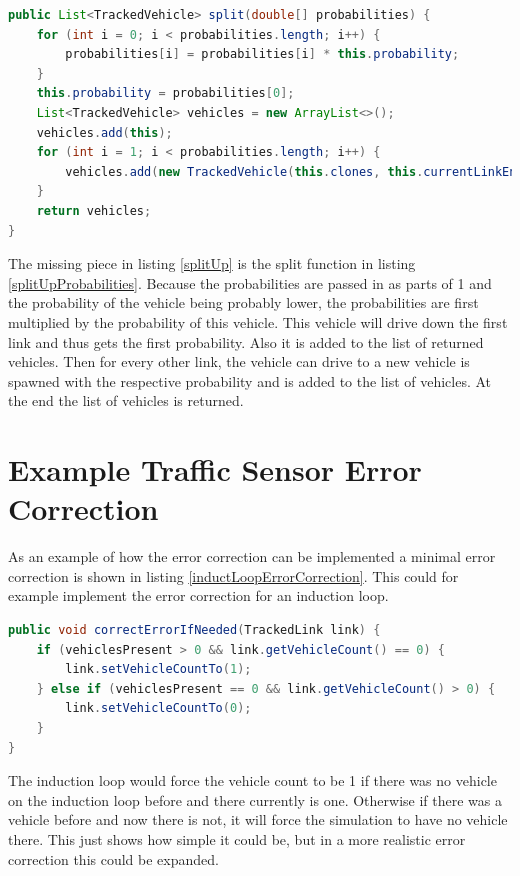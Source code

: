 \vspace{0.5em}

\begin{lstlisting}[caption={Split Up Vehicle Probabilities}, label=splitUpProbabilities, language=Java]
public List<TrackedVehicle> split(double[] probabilities) {
	for (int i = 0; i < probabilities.length; i++) {
		probabilities[i] = probabilities[i] * this.probability;
	}
	this.probability = probabilities[0];
	List<TrackedVehicle> vehicles = new ArrayList<>();
	vehicles.add(this);
	for (int i = 1; i < probabilities.length; i++) {
		vehicles.add(new TrackedVehicle(this.clones, this.currentLinkEnteredTime, probabilities[i]));
	}
	return vehicles;
}
\end{lstlisting}

The missing piece in listing \ref{splitUp} is the split function in listing \ref{splitUpProbabilities}. Because the probabilities are passed in as parts of 1 and the probability of the vehicle being probably lower, the probabilities are first multiplied by the probability of this vehicle. This vehicle will drive down the first link and thus gets the first probability. Also it is added to the list of returned vehicles. Then for every other link, the vehicle can drive to a new vehicle is spawned with the respective probability and is added to the list of vehicles. At the end the list of vehicles is returned.

\section{Example Traffic Sensor Error Correction}

As an example of how the error correction can be implemented a minimal error correction is shown in listing \ref{inductLoopErrorCorrection}. This could for example implement the error correction for an induction loop.

\vspace{0.5em}

\begin{lstlisting}[caption={Induction Loop Error Correction}, label=inductLoopErrorCorrection, language=Java]
public void correctErrorIfNeeded(TrackedLink link) {
	if (vehiclesPresent > 0 && link.getVehicleCount() == 0) {
		link.setVehicleCountTo(1);
	} else if (vehiclesPresent == 0 && link.getVehicleCount() > 0) {
		link.setVehicleCountTo(0);
	}
}
\end{lstlisting}

The induction loop would force the vehicle count to be 1 if there was no vehicle on the induction loop before and there currently is one. Otherwise if there was a vehicle before and now there is not, it will force the simulation to have no vehicle there. This just shows how simple it could be, but in a more realistic error correction this could be expanded.

